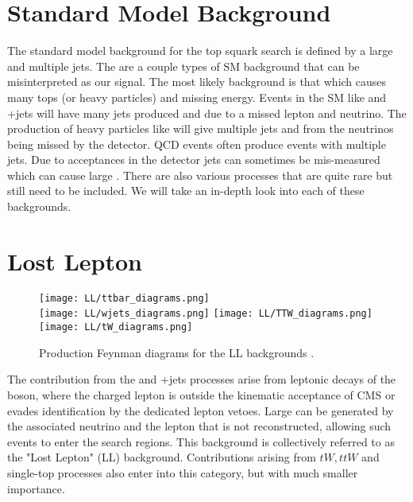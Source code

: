 \section{Standard Model Background}
\label{sec:SMBackground}

The standard model background for the top squark search is defined by a large \met{} and multiple jets. The are a couple types of SM background that can be misinterpreted as our signal. The most likely background is that which causes many tops (or heavy particles) and missing energy. Events in the SM like \ttbar{} and \W+jets will have many jets produced and \met{} due to a missed lepton and neutrino. The production of heavy particles like \Znunu{} will give multiple jets and \met{} from the neutrinos being missed by the detector. QCD events often produce events with multiple jets. Due to acceptances in the detector jets can sometimes be mis-measured which can cause large \met{}. There are also various processes that are quite rare but still need to be included. We will take an in-depth look into each of these backgrounds. 

\section{Lost Lepton}
\label{sec:LL}

\begin{figure}
	\begin{center}
  \texttt{[image: LL/ttbar\_diagrams.png]}\\
  \texttt{[image: LL/wjets\_diagrams.png]}
  \texttt{[image: LL/TTW\_diagrams.png]} 
  \texttt{[image: LL/tW\_diagrams.png]} \\

	\caption[\ttbar{} Production]{Production Feynman diagrams for the LL backgrounds \cite{fiedler_precision_nodate, khachatryan_search_2016, aad_measurement_2013}. }
	\label{fig:llb-ttbar-diagram}
	\end{center}
\end{figure}

The contribution from the \ttbar{} and \W+jets processes arise from leptonic decays of the \W{} boson, where the charged lepton is outside the kinematic acceptance of CMS or evades identification by the dedicated lepton vetoes. Large \met{} can be generated by the associated neutrino and the lepton that is not reconstructed, allowing such events to enter the search regions. This background is collectively referred to as the "Lost Lepton" (LL) background. Contributions arising from $tW, ttW$ and single-top processes also enter into this category, but with much smaller importance. 

